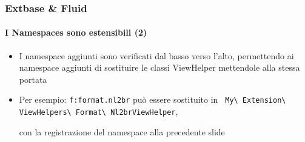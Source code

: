 
\begin{frame}[fragile]
	\frametitle{Extbase \& Fluid}
	\framesubtitle{I Namespaces sono estensibili (2)}

	\begin{itemize}

		\item I namespace aggiunti sono verificati dal basso verso l'alto, permettendo
			ai namespace aggiunti di sostituire le classi ViewHelper mettendole 
			alla stessa portata

		\item Per esempio: \texttt{f:format.nl2br} può essere sostituito in
			\texttt{
				My\textbackslash
				Extension\textbackslash
				ViewHelpers\textbackslash
				Format\textbackslash
				Nl2brViewHelper},

				con la registrazione del namespace alla precedente slide

	\end{itemize}

\end{frame}


